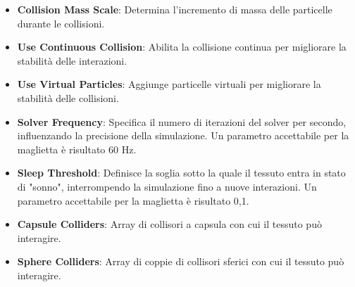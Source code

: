 \documentclass[11pt]{report}
\begin{document}
\begin{itemize}
    \item \textbf{Collision Mass Scale}: Determina l'incremento di massa delle particelle durante le collisioni.
    
    \item \textbf{Use Continuous Collision}: Abilita la collisione continua per migliorare la stabilità delle interazioni.
    
    \item \textbf{Use Virtual Particles}: Aggiunge particelle virtuali per migliorare la stabilità delle collisioni.
    
    \item \textbf{Solver Frequency}: Specifica il numero di iterazioni del solver per secondo, influenzando la precisione della simulazione. Un parametro accettabile per la maglietta è risultato 60 Hz.
    
    \item \textbf{Sleep Threshold}: Definisce la soglia sotto la quale il tessuto entra in stato di "sonno", interrompendo la simulazione fino a nuove interazioni. Un parametro accettabile per la maglietta è risultato 0,1. 
    
    \item \textbf{Capsule Colliders}: Array di collisori a capsula con cui il tessuto può interagire.
    
    \item \textbf{Sphere Colliders}: Array di coppie di collisori sferici con cui il tessuto può interagire.
\end{itemize}



\end{document}
